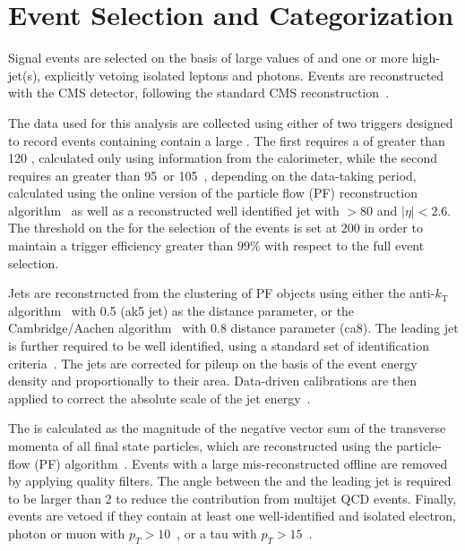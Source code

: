 \section{Event Selection and Categorization}\label{sec:selection}

Signal events are selected on the basis of large values of \ETm and one or more high-\pt jet(s), 
explicitly vetoing isolated leptons and photons. Events are
reconstructed with the CMS detector, following the standard CMS reconstruction~\cite{CMSdetector}. 

The data used for this analysis are collected using either of two triggers designed to record events containing 
contain a large \ETm. The first requires a \ETm of greater than 120 \gev, calculated only using information from the calorimeter, 
while the second requires an \ETm greater than 95~\gev or 105~\gev, depending on the data-taking period, calculated using the online version of 
the particle flow (PF) reconstruction algorithm~\cite{CMS-PAS-PFT-09-001} as well as a reconstructed well identified jet with \pt$>80$ \gev and $|\eta|<2.6$. 
The threshold on the \ETm for the selection of the events is set at 200 \gev in order to maintain a trigger efficiency greater than 
$99$\% with respect to the full event selection. 

Jets are reconstructed from the clustering of PF objects using either the 
anti-$k_{\textrm{T}}$ algorithm~\cite{Cacciari:2008gp} with 0.5 (ak5 jet) as the distance parameter,  
or the Cambridge/Aachen algorithm~\cite{cajets} with 0.8 distance
parameter (ca8). The leading jet is further required to be well
identified, using a standard set of identification criteria~\cite{jec}. The jets are corrected for pileup on the basis of the event energy density and 
proportionally to their area. Data-driven calibrations are then applied to correct the absolute scale of the jet energy~\cite{jec}.

The \ETm is calculated as the magnitude of the negative 
vector sum of the transverse momenta of all final state particles, which are reconstructed 
using the particle-flow (PF) algorithm~\cite{CMS-PAS-PFT-09-001}.
Events with a large mis-reconstructed offline \ETm are removed by applying quality filters. 
The angle between the \ETm and the leading jet is required to be larger than 2 to reduce the contribution from multijet QCD events. 
Finally, events are vetoed if they contain at least one well-identified and isolated electron, photon or muon with $p_T>10$~\gev, or a tau with $p_T>15$~\gev.

